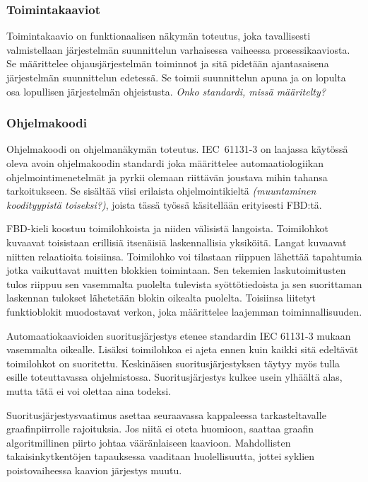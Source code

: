 \documentclass[finnish,12pt]{article}
\begin{document}
		\subsubsection{Toimintakaaviot}

Toimintakaavio on funktionaalisen näkymän toteutus, joka tavallisesti valmistellaan järjestelmän suunnittelun varhaisessa vaiheessa prosessikaaviosta.
Se määrittelee ohjausjärjestelmän toiminnot ja sitä pidetään ajantasaisena järjestelmän suunnittelun edetessä.
Se toimii suunnittelun apuna ja on lopulta osa lopullisen järjestelmän ohjeistusta.
\emph{Onko standardi, missä määritelty?}

		\subsubsection{Ohjelmakoodi}

Ohjelmakoodi on ohjelmanäkymän toteutus.
IEC~61131-3 on laajassa käytössä oleva avoin ohjelmakoodin standardi joka määrittelee automaatiologiikan ohjelmointimenetelmät ja pyrkii olemaan riittävän joustava mihin tahansa tarkoitukseen.
Se sisältää viisi erilaista ohjelmointikieltä \emph{(muuntaminen koodityypistä toiseksi?)}, joista tässä työssä käsitellään erityisesti FBD:tä.

FBD-kieli koostuu toimilohkoista ja niiden välisistä langoista.
Toimilohkot kuvaavat toisistaan erillisiä itsenäisiä laskennallisia yksiköitä.
Langat kuvaavat niitten relaatioita toisiinsa.
Toimilohko voi tilastaan riippuen lähettää tapahtumia jotka vaikuttavat muitten blokkien toimintaan.
Sen tekemien laskutoimitusten tulos riippuu sen vasemmalta puolelta tulevista syöttötiedoista ja sen suorittaman laskennan tulokset lähetetään blokin oikealta puolelta.
Toisiinsa liitetyt funktioblokit muodostavat verkon, joka määrittelee laajemman toiminnallisuuden.

Automaatiokaavioiden suoritusjärjestys etenee standardin IEC 61131-3 mukaan
vasemmalta oikealle. Lisäksi toimilohkoa ei ajeta ennen kuin kaikki sitä edeltävät toimilohkot on suoritettu.
Keskinäisen suoritusjärjestyksen täytyy myös tulla esille toteuttavassa ohjelmistossa.
Suoritusjärjestys kulkee usein ylhäältä alas, mutta tätä ei voi olettaa aina todeksi.

Suoritusjärjestysvaatimus asettaa seuraavassa kappaleessa tarkasteltavalle graafinpiirrolle rajoituksia.
Jos niitä ei oteta huomioon, saattaa graafin algoritmillinen piirto johtaa vääränlaiseen kaavioon.
Mahdollisten takaisinkytkentöjen tapauksessa vaaditaan huolellisuutta, jottei syklien poistovaiheessa kaavion järjestys muutu.
\end{document}
